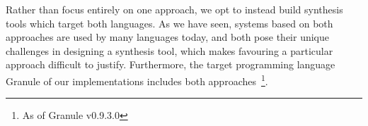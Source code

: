 Rather than focus entirely on one approach, we opt to instead build synthesis
tools which target both languages. As we have seen, systems based on both
approaches are used by many languages today, and both pose their unique
challenges in designing a synthesis tool, which makes favouring a particular
approach difficult to justify. Furthermore, the target programming language
Granule of our implementations includes both approaches~\footnote{As of Granule
v0.9.3.0}. 